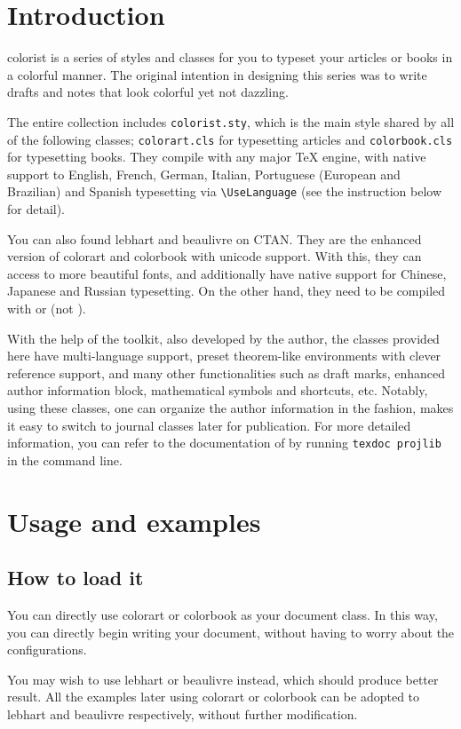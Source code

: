 \documentclass[title in boldface, title in scshape, simple name]{colorart}
\newenvironment{tip}[1][Tip]{%
    \begin{tcolorbox}[breakable,
        enhanced,
        width = \textwidth,
        colback = paper, colbacktitle = paper,
        colframe = gray!50, boxrule=0.2mm,
        coltitle = black,
        fonttitle = \sffamily,
        attach boxed title to top left = {yshift=-\tcboxedtitleheight/2, xshift=.5cm},
        boxed title style = {boxrule=0pt, colframe=paper},
        before skip = 0.3cm,
        after skip = 0.3cm,
        top = 3mm,
        bottom = 3mm,
        title={\scshape\sffamily #1}]%
}{\end{tcolorbox}}
\providecommand{\colorist}{\textsf{colorist}}
\providecommand{\colorart}{\textsf{colorart}}
\providecommand{\colorbook}{\textsf{colorbook}}
\providecommand{\lebhart}{\textsf{lebhart}}
\providecommand{\beaulivre}{\textsf{beaulivre}}
\let\LevelOneTitle\section
\let\LevelTwoTitle\subsection
\begin{document}
\LevelOneTitle{Introduction}

\colorist{} is a series of styles and classes for you to typeset your articles or books in a colorful manner. The original intention in designing this series was to write drafts and notes that look colorful yet not dazzling.

The entire collection includes \verb|colorist.sty|, which is the main style shared by all of the following classes; \verb|colorart.cls| for typesetting articles and \verb|colorbook.cls| for typesetting books. They compile with any major \TeX{} engine, with native support to English, French, German, Italian, Portuguese (European and Brazilian) and Spanish typesetting via \lstinline|\UseLanguage| (see the instruction below for detail).

You can also found \lebhart{} and \beaulivre{} on CTAN. They are the enhanced version of \colorart{} and \colorbook{} with unicode support. With this, they can access to more beautiful fonts, and additionally have native support for Chinese, Japanese and Russian typesetting. On the other hand, they need to be compiled with  or  (not ).

With the help of the \ProjLib{} toolkit, also developed by the author, the classes provided here have multi-language support, preset theorem-like environments with clever reference support, and many other functionalities such as draft marks, enhanced author information block, mathematical symbols and shortcuts, etc. Notably, using these classes, one can organize the author information in the \AmS{} fashion, makes it easy to switch to journal classes later for publication. For more detailed information, you can refer to the documentation of \ProjLib{} by running \lstinline|texdoc projlib| in the command line.

\LevelOneTitle{Usage and examples}

\LevelTwoTitle{How to load it}
You can directly use \colorart{} or \colorbook{} as your document class. In this way, you can directly begin writing your document, without having to worry about the configurations.


\begin{tip}
    You may wish to use \lebhart{} or \beaulivre{} instead, which should produce better result. All the examples later using \colorart{} or \colorbook{} can be adopted to \lebhart{} and \beaulivre{} respectively, without further modification.
\end{tip}
\end{document}
